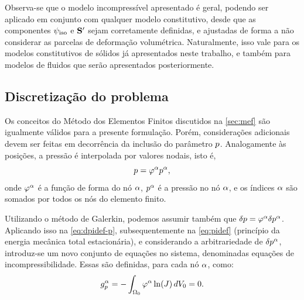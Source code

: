 \documentclass[Tese.tex]{subfiles}
\begin{document}
Observa-se que o modelo incompressível apresentado é geral, podendo ser aplicado em conjunto com qualquer modelo constitutivo, desde que as componentes $\psi_\text{iso}$ e $\mathbf{S}'$ sejam corretamente definidas, e ajustadas de forma a não considerar as parcelas de deformação volumétrica. Naturalmente, isso vale para os modelos constitutivos de sólidos já apresentados neste trabalho, e também para modelos de fluidos que serão apresentados posteriormente.

\subsection{Discretização do problema}

Os conceitos do Método dos Elementos Finitos discutidos na \autoref{sec:mef} são igualmente válidos para a presente formulação. Porém, considerações adicionais devem ser feitas em decorrência da inclusão do parâmetro $p$. Analogamente às posições, a pressão é interpolada por valores nodais, isto é,
\begin{equation}\label{eq:interp-p}
p=\varphi^\alpha p^\alpha,
\end{equation}
onde $\varphi^\alpha$ é a função de forma do nó $\alpha$, $p^\alpha$ é a pressão no nó $\alpha$, e os índices $\alpha$ são somados por todos os nós do elemento finito.

Utilizando o método de Galerkin, podemos assumir também que $\delta p = \varphi^\alpha\delta p^\alpha$. Aplicando isso na \cref{eq:dpidef-p}, subsequentemente na \cref{eq:pidef} (princípio da energia mecânica total estacionária), e considerando a arbitrariedade de $\delta p^\alpha$, introduz-se um novo conjunto de equações no sistema, denominadas equações de incompressibilidade. Essas são definidas, para cada nó $\alpha$, como:
\begin{equation}\label{eq:incomp}
{g}_{p}^\alpha = -\int_{\Omega_0}\varphi^\alpha\ln(J)\,dV_0 = 0.
\end{equation}
\end{document}
